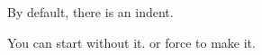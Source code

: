 \documentclass{article}
\begin{document}
\vspace*{\fill} \vspace*{-5ex}

By default, there is an indent.
\par\noindent You can start without it. \indent or force to make it.

\vspace*{\fill}
\end{document}
